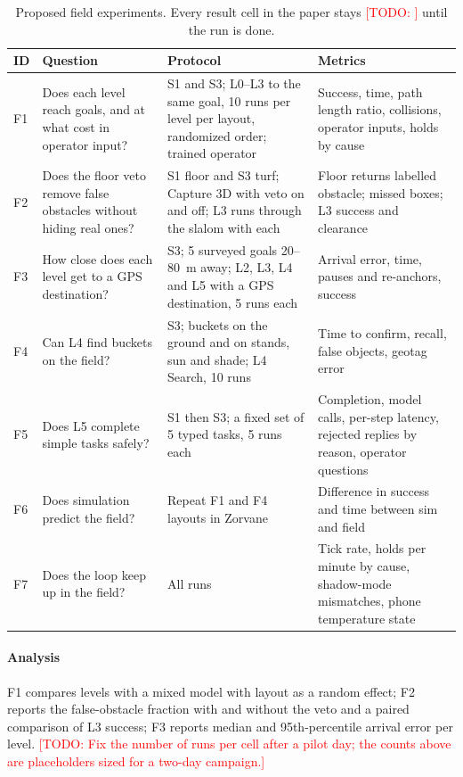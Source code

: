 \documentclass[conference]{IEEEtran}
\newcommand{\todo}[1]{\textcolor{red}{[TODO: #1]}}
\begin{document}
\begin{table}[t]
\centering
\caption{Proposed field experiments. Every result cell in the paper stays \todo{} until the run is done.}
\label{tab:eval}
\small
\begin{tabularx}{\textwidth}{@{}l >{\raggedright\arraybackslash}p{4.0cm} >{\raggedright\arraybackslash}X >{\raggedright\arraybackslash}p{3.3cm}@{}}
\toprule
ID & Question & Protocol & Metrics \\
\midrule
F1 & Does each level reach goals, and at what cost in operator input? & S1 and S3; L0--L3 to the same goal, 10 runs per level per layout, randomized order; trained operator & Success, time, path length ratio, collisions, operator inputs, holds by cause \\
F2 & Does the floor veto remove false obstacles without hiding real ones? & S1 floor and S3 turf; Capture 3D with veto on and off; L3 runs through the slalom with each & Floor returns labelled obstacle; missed boxes; L3 success and clearance \\
F3 & How close does each level get to a GPS destination? & S3; 5 surveyed goals 20--80~m away; L2, L3, L4 and L5 with a GPS destination, 5 runs each & Arrival error, time, pauses and re-anchors, success \\
F4 & Can L4 find buckets on the field? & S3; buckets on the ground and on stands, sun and shade; L4 Search, 10 runs & Time to confirm, recall, false objects, geotag error \\
F5 & Does L5 complete simple tasks safely? & S1 then S3; a fixed set of 5 typed tasks, 5 runs each & Completion, model calls, per-step latency, rejected replies by reason, operator questions \\
F6 & Does simulation predict the field? & Repeat F1 and F4 layouts in Zorvane & Difference in success and time between sim and field \\
F7 & Does the loop keep up in the field? & All runs & Tick rate, holds per minute by cause, shadow-mode mismatches, phone temperature state \\
\bottomrule
\end{tabularx}
\end{table}

\paragraph{Analysis}
F1 compares levels with a mixed model with layout as a random effect; F2 reports the false-obstacle fraction with and without the veto and a paired comparison of L3 success; F3 reports median and 95th-percentile arrival error per level.
\todo{Fix the number of runs per cell after a pilot day; the counts above are placeholders sized for a two-day campaign.}
\end{document}
